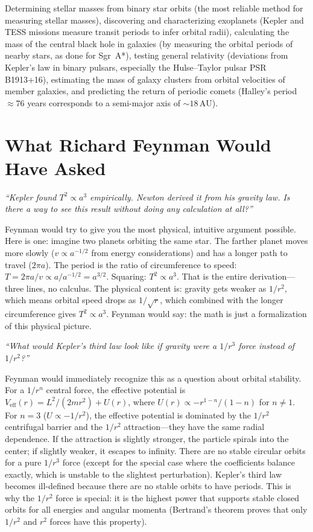 \documentclass[11pt,openright]{book}
\begin{document}
Determining stellar masses from binary star orbits (the most reliable method for measuring stellar masses), discovering and characterizing exoplanets (Kepler and TESS missions measure transit periods to infer orbital radii), calculating the mass of the central black hole in galaxies (by measuring the orbital periods of nearby stars, as done for Sgr~A*), testing general relativity (deviations from Kepler's law in binary pulsars, especially the Hulse--Taylor pulsar PSR B1913+16), estimating the mass of galaxy clusters from orbital velocities of member galaxies, and predicting the return of periodic comets (Halley's period $\approx 76$ years corresponds to a semi-major axis of $\sim 18\,\text{AU}$).
\section*{What Richard Feynman Would Have Asked}

\textit{``Kepler found $T^2 \propto a^3$ empirically. Newton derived it from his gravity law. Is there a way to see this result without doing any calculation at all?''}

Feynman would try to give you the most physical, intuitive argument possible. Here is one: imagine two planets orbiting the same star. The farther planet moves more slowly ($v \propto a^{-1/2}$ from energy considerations) and has a longer path to travel ($2\pi a$). The period is the ratio of circumference to speed: $T = 2\pi a/v \propto a/a^{-1/2} = a^{3/2}$. Squaring: $T^2 \propto a^3$. That is the entire derivation---three lines, no calculus. The physical content is: gravity gets weaker as $1/r^2$, which means orbital speed drops as $1/\sqrt{r}$, which combined with the longer circumference gives $T^2 \propto a^3$. Feynman would say: the math is just a formalization of this physical picture.

\textit{``What would Kepler's third law look like if gravity were a $1/r^3$ force instead of $1/r^2$?''}

Feynman would immediately recognize this as a question about orbital stability. For a $1/r^n$ central force, the effective potential is $V_{\text{eff}}(r) = L^2/(2mr^2) + U(r)$, where $U(r) \propto -r^{1-n}/(1-n)$ for $n\neq 1$. For $n = 3$ ($U \propto -1/r^2$), the effective potential is dominated by the $1/r^2$ centrifugal barrier and the $1/r^2$ attraction---they have the same radial dependence. If the attraction is slightly stronger, the particle spirals into the center; if slightly weaker, it escapes to infinity. There are no stable circular orbits for a pure $1/r^3$ force (except for the special case where the coefficients balance exactly, which is unstable to the slightest perturbation). Kepler's third law becomes ill-defined because there are no stable orbits to have periods. This is why the $1/r^2$ force is special: it is the highest power that supports stable closed orbits for all energies and angular momenta (Bertrand's theorem proves that only $1/r^2$ and $r^2$ forces have this property).
\end{document}
